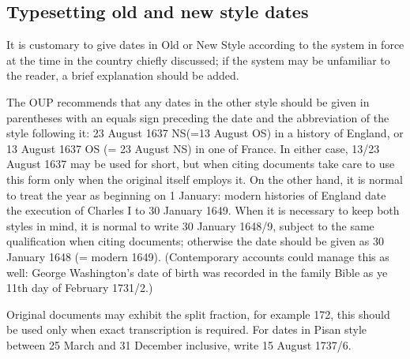 \subsection{Typesetting old and new style dates}

It is customary to give dates in Old or New Style according to the system
in force at the time in the country chiefly discussed; if the system may be
unfamiliar to the reader, a brief explanation should be added.

The OUP recommends that any dates
in the other style should be given in parentheses with an equals sign
preceding the date and the abbreviation of the style following it: 23
August 1637 NS(=13 August OS) in a history of England, or 13 August 1637
OS (= 23 August NS) in one of France. In either case, 13/23 August 1637 may
be used for short, but when citing documents take care to use this form
only when the original itself employs it. On the other hand, it is normal
to treat the year as beginning on 1 January: modern histories of England
date the execution of Charles I to 30 January 1649. When it is necessary to
keep both styles in mind, it is normal to write 30 January 1648/9, subject to
the same qualification when citing documents; otherwise the date
should be given as 30 January 1648 (= modern 1649). (Contemporary accounts
could manage this as well: George Washington's date of birth was
recorded in the family Bible as ye 11th day of February 1731/2.) 

Original
documents may exhibit the split fraction, for example 172, this should
be used only when exact transcription is required. For dates in Pisan style
between 25 March and 31 December inclusive, write 15 August 1737/6. 









